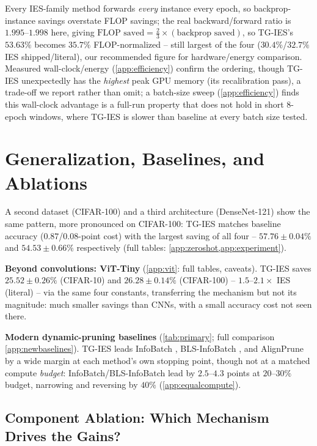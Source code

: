 \documentclass{article}
\theoremstyle{plain}
\theoremstyle{definition}
\theoremstyle{remark}
\begin{document}
Every IES-family method forwards \emph{every} instance every epoch, so backprop-instance savings overstate FLOP savings; the real backward/forward ratio is $1.995$--$1.998$ here, giving $\text{FLOP saved} = \tfrac23\times(\text{backprop saved})$, so TG-IES's $53.63\%$ becomes $\mathbf{35.7\%}$ FLOP-normalized -- still largest of the four ($30.4\%$/$32.7\%$ IES shipped/literal), our recommended figure for hardware/energy comparison. Measured wall-clock/energy (\cref{app:efficiency}) confirm the ordering, though TG-IES unexpectedly has the \emph{highest} peak GPU memory (its recalibration pass), a trade-off we report rather than omit; a batch-size sweep (\cref{app:efficiency}) finds this wall-clock advantage is a full-run property that does not hold in short 8-epoch windows, where TG-IES is slower than baseline at every batch size tested.

\section{Generalization, Baselines, and Ablations}
\label{sec:generalization}

A second dataset (CIFAR-100) and a third architecture (DenseNet-121) show the same pattern, more pronounced on CIFAR-100: TG-IES matches baseline accuracy ($0.87$/$0.08$-point cost) with the largest saving of all four -- $57.76\pm0.04\%$ and $54.53\pm0.66\%$ respectively (full tables: \cref{app:zeroshot,app:experiment}).

\textbf{Beyond convolutions: ViT-Tiny} (\cref{app:vit}: full tables, caveats). TG-IES saves $25.52\pm0.26\%$ (CIFAR-10) and $26.28\pm0.14\%$ (CIFAR-100) -- $1.5$--$2.1\times$ IES (literal) -- via the same four constants, transferring the mechanism but not its magnitude: much smaller savings than CNNs, with a small accuracy cost not seen there.

\textbf{Modern dynamic-pruning baselines} (\cref{tab:primary}; full comparison \cref{app:newbaselines}). TG-IES leads InfoBatch \citep{qin2024infobatch}, BLS-InfoBatch \citep{zhou2026bls}, and AlignPrune \citep{qin2026alignprune} by a wide margin at each method's own stopping point, though not at a matched compute \emph{budget}: InfoBatch/BLS-InfoBatch lead by $2.5$--$4.3$ points at $20$--$30\%$ budget, narrowing and reversing by $40\%$ (\cref{app:equalcompute}).

\subsection{Component Ablation: Which Mechanism Drives the Gains?}
\label{sec:ablation}
\end{document}
